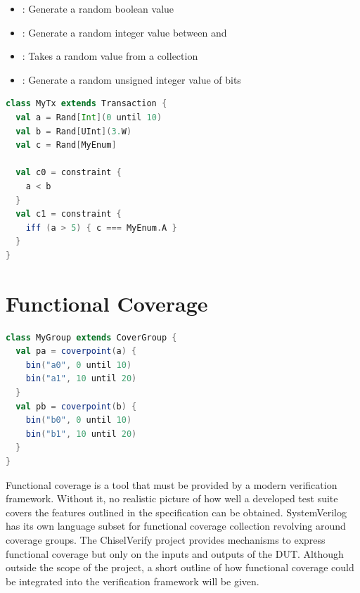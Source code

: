 \begin{itemize}
  \item {}: Generate a random boolean value
  \item {}: Generate a random integer value between  and 
  \item {}: Takes a random value from a collection
  \item {}: Generate a random unsigned integer value of  bits
\end{itemize}

\begin{listing}
\begin{lstlisting}[language=scala, captionpos=b, caption=Outline of the syntax for random variables and constraints.,label=lst:crv_syntax]
class MyTx extends Transaction {
  val a = Rand[Int](0 until 10)
  val b = Rand[UInt](3.W)
  val c = Rand[MyEnum]

  val c0 = constraint {
    a < b
  }
  val c1 = constraint {
    iff (a > 5) { c === MyEnum.A }
  }
}
\end{lstlisting}
\end{listing}

\section{Functional Coverage} %

\begin{listing}
\begin{lstlisting}[language=scala, captionpos=b, caption=Outline of the syntax for the collection of functional coverage.,label=lst:cover_syntax]
class MyGroup extends CoverGroup {
  val pa = coverpoint(a) {
    bin("a0", 0 until 10)
    bin("a1", 10 until 20)
  }
  val pb = coverpoint(b) {
    bin("b0", 0 until 10)
    bin("b1", 10 until 20)
  }
}
\end{lstlisting}
\end{listing}

Functional coverage is a tool that must be provided by a modern verification framework. Without it, no realistic
picture of how well a developed test suite covers the features outlined in the specification can be obtained.
SystemVerilog has its own language subset for functional coverage collection revolving around coverage groups. The ChiselVerify project provides mechanisms to express functional coverage but only on the inputs and outputs of the DUT.
Although outside the scope of the project, a short outline of how functional coverage could be integrated into the
verification framework will be given.


